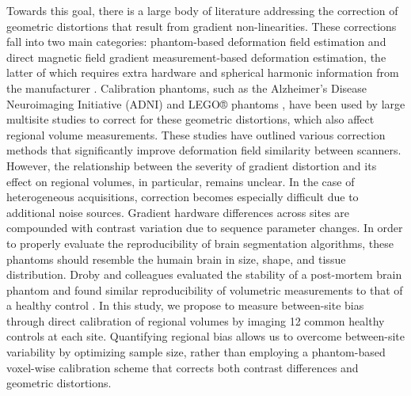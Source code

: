 Towards this goal, there is a large body of literature addressing the correction of geometric distortions that result from gradient non-linearities. These corrections fall into two main categories: phantom-based deformation field estimation and direct magnetic field gradient measurement-based deformation estimation, the latter of which requires extra hardware and spherical harmonic information from the manufacturer \cite{fonov2010improved}. Calibration phantoms, such as the Alzheimer's Disease Neuroimaging Initiative (ADNI) \cite{gunter2009measurement} and LEGO® phantoms \cite{caramanos2010gradient}, have been used by large multisite studies to correct for these geometric distortions, which also affect regional volume measurements. These studies have outlined various correction methods that significantly improve deformation field similarity between scanners. However, the relationship between the severity of gradient distortion and its effect on regional volumes, in particular, remains unclear. In the case of heterogeneous acquisitions, correction becomes especially difficult due to additional noise sources. Gradient hardware differences across sites are compounded with contrast variation due to sequence parameter changes. In order to properly evaluate the reproducibility of brain segmentation algorithms, these phantoms should resemble the humain brain in size, shape, and tissue distribution. Droby and colleagues evaluated the stability of a post-mortem brain phantom and found similar reproducibility of volumetric measurements to that of a healthy control \cite{droby2015human}. In this study, we propose to measure between-site bias through direct calibration of regional volumes by imaging 12 common healthy controls at each site. Quantifying regional bias allows us to overcome between-site variability by optimizing sample size, rather than employing a phantom-based voxel-wise calibration scheme that corrects both contrast differences and geometric distortions. 